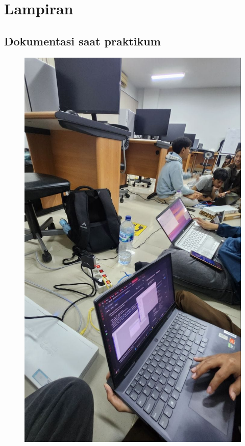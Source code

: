 \section{Lampiran}
\subsection{Dokumentasi saat praktikum}

    \begin{figure}[H]
        \centering
        \includegraphics[width=0.5\linewidth]{P1/img/dokum.jpeg}
        \label{fig:Dokum}
    \end{figure}


